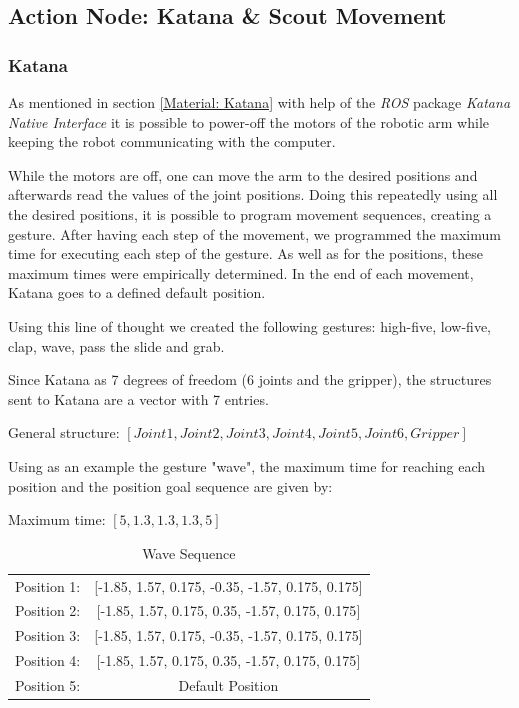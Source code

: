 

\subsection{Action Node: Katana \& Scout Movement}
\subsubsection{Katana}
As mentioned in section \ref{Material: Katana} with help of the \textit{ROS} package \textit{Katana Native Interface} it is possible to power-off the motors of the robotic arm while keeping the robot communicating with the computer.

While the motors are off, one can move the arm to the desired positions and afterwards read the values of the joint positions. Doing this repeatedly using all the desired positions, it is possible to program movement sequences, creating a gesture. After having each step of the movement, we programmed the maximum time for executing each step of the gesture. As well as for the positions, these maximum times were empirically determined. In the end of each movement, Katana goes to a defined default position.

Using this line of thought we created the following gestures: high-five, low-five, clap, wave, pass the slide and grab.

Since Katana as 7 degrees of freedom (6 joints and the gripper), the structures sent to Katana are a vector with 7 entries.
\begin{center}
General structure:
$\left[ Joint1, Joint2, Joint3, Joint4, Joint5, Joint6, Gripper\right]$\\
\end{center}
Using as an example the gesture "wave", the maximum time for reaching each position and the position goal sequence are given by:
\begin{center}
Maximum time:
$\left[5, 1.3, 1.3, 1.3, 5\right]$\\
\end{center}
\begin{table}[!h]
\centering
\begin{tabular}{lc}
Position 1: & {[}-1.85, 1.57, 0.175, -0.35, -1.57, 0.175, 0.175{]} \\
Position 2: & {[}-1.85, 1.57, 0.175, 0.35, -1.57, 0.175, 0.175{]}  \\
Position 3: & {[}-1.85, 1.57, 0.175, -0.35, -1.57, 0.175, 0.175{]} \\
Position 4: & {[}-1.85, 1.57, 0.175, 0.35, -1.57, 0.175, 0.175{]}  \\
Position 5: & Default Position                                    
\end{tabular}
\caption{Wave Sequence}
\label{wave}
\end{table}

